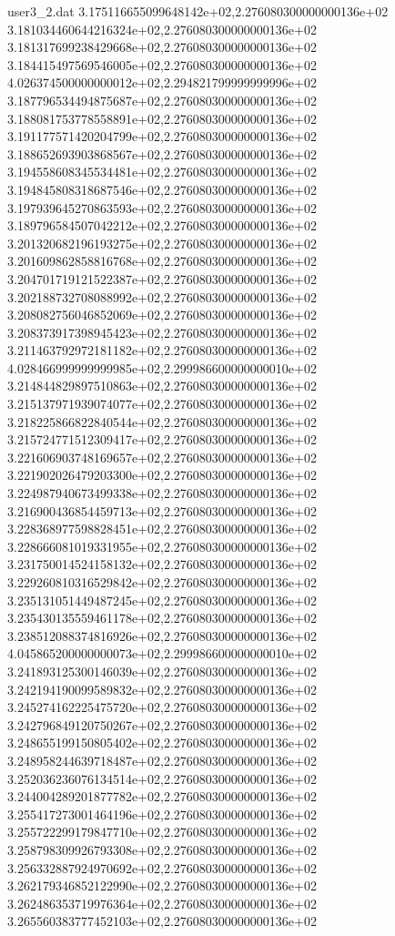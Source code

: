\begin{filecontents}{user3_2.dat}
3.175116655099648142e+02,2.276080300000000136e+02
3.181034460644216324e+02,2.276080300000000136e+02
3.181317699238429668e+02,2.276080300000000136e+02
3.184415497569546005e+02,2.276080300000000136e+02
4.026374500000000012e+02,2.294821799999999996e+02
3.187796534494875687e+02,2.276080300000000136e+02
3.188081753778558891e+02,2.276080300000000136e+02
3.191177571420204799e+02,2.276080300000000136e+02
3.188652693903868567e+02,2.276080300000000136e+02
3.194558608345534481e+02,2.276080300000000136e+02
3.194845808318687546e+02,2.276080300000000136e+02
3.197939645270863593e+02,2.276080300000000136e+02
3.189796584507042212e+02,2.276080300000000136e+02
3.201320682196193275e+02,2.276080300000000136e+02
3.201609862858816768e+02,2.276080300000000136e+02
3.204701719121522387e+02,2.276080300000000136e+02
3.202188732708088992e+02,2.276080300000000136e+02
3.208082756046852069e+02,2.276080300000000136e+02
3.208373917398945423e+02,2.276080300000000136e+02
3.211463792972181182e+02,2.276080300000000136e+02
4.028466999999999985e+02,2.299986600000000010e+02
3.214844829897510863e+02,2.276080300000000136e+02
3.215137971939074077e+02,2.276080300000000136e+02
3.218225866822840544e+02,2.276080300000000136e+02
3.215724771512309417e+02,2.276080300000000136e+02
3.221606903748169657e+02,2.276080300000000136e+02
3.221902026479203300e+02,2.276080300000000136e+02
3.224987940673499338e+02,2.276080300000000136e+02
3.216900436854459713e+02,2.276080300000000136e+02
3.228368977598828451e+02,2.276080300000000136e+02
3.228666081019331955e+02,2.276080300000000136e+02
3.231750014524158132e+02,2.276080300000000136e+02
3.229260810316529842e+02,2.276080300000000136e+02
3.235131051449487245e+02,2.276080300000000136e+02
3.235430135559461178e+02,2.276080300000000136e+02
3.238512088374816926e+02,2.276080300000000136e+02
4.045865200000000073e+02,2.299986600000000010e+02
3.241893125300146039e+02,2.276080300000000136e+02
3.242194190099589832e+02,2.276080300000000136e+02
3.245274162225475720e+02,2.276080300000000136e+02
3.242796849120750267e+02,2.276080300000000136e+02
3.248655199150805402e+02,2.276080300000000136e+02
3.248958244639718487e+02,2.276080300000000136e+02
3.252036236076134514e+02,2.276080300000000136e+02
3.244004289201877782e+02,2.276080300000000136e+02
3.255417273001464196e+02,2.276080300000000136e+02
3.255722299179847710e+02,2.276080300000000136e+02
3.258798309926793308e+02,2.276080300000000136e+02
3.256332887924970692e+02,2.276080300000000136e+02
3.262179346852122990e+02,2.276080300000000136e+02
3.262486353719976364e+02,2.276080300000000136e+02
3.265560383777452103e+02,2.276080300000000136e+02

\end{filecontents}
